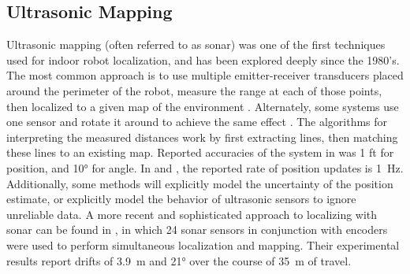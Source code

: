\documentclass{article}
\begin{document}
  \subsection{Ultrasonic Mapping}

    Ultrasonic mapping (often referred to as sonar) was one of the first techniques used for indoor robot localization, and has been explored deeply since the 1980's. The most common approach is to use multiple emitter-receiver transducers placed around the perimeter of the robot, measure the range at each of those points, then localized to a given map of the environment \cite{drumheller_mobile_1987}. Alternately, some systems use one sensor and rotate it around to achieve the same effect \cite{leonard_mobile_1991, drumheller_mobile_1987}. The algorithms for interpreting the measured distances work by first extracting lines, then matching these lines to an existing map. Reported accuracies of the system in \cite{drumheller_mobile_1987} was 1 ft for position, and \ang{10} for angle. In \cite{drumheller_mobile_1987} and \cite{leonard_mobile_1991}, the reported rate of position updates is \SI{1}{\hertz}. Additionally, some methods will explicitly model the uncertainty of the position estimate, or explicitly model the behavior of ultrasonic sensors to ignore unreliable data. A more recent and sophisticated approach to localizing with sonar can be found in \cite{tardos_robust_2002}, in which 24 sonar sensors in conjunction with encoders were used to perform simultaneous localization and mapping. Their experimental results report drifts of \SI{3.9}{\meter} and \ang{21} over the course of \SI{35}{\meter} of travel.
\end{document}
